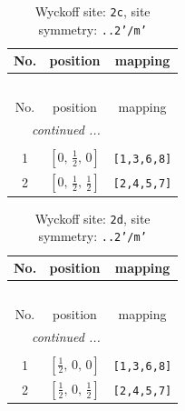 \documentclass[fleqn,8pt]{jsarticle}
\begin{document}
\renewcommand{\arraystretch}{1.2}
\begin{longtable}{ccc}
\caption{Wyckoff site: {\tt 2c}, site symmetry: {\tt ..2'/m'}}
 \\
 \hline \hline
No. & position & mapping \\ \hline \endfirsthead

\multicolumn{2}{l}{\tablename\ \thetable{}} \\
 \hline \hline
No. & position & mapping \\ \hline \endhead

 \hline \hline
\multicolumn{2}{r}{\footnotesize\it continued ...} \\ \endfoot

 \hline \hline
\multicolumn{2}{r}{} \\ \endlastfoot

1 & $\left[ 0,\, \frac{1}{2},\, 0 \right]$ & {\tt [1,3,6,8]} \\ \hline
2 & $\left[ 0,\, \frac{1}{2},\, \frac{1}{2} \right]$ & {\tt [2,4,5,7]} \\
\end{longtable}
\renewcommand{\arraystretch}{1.2}
\begin{longtable}{ccc}
\caption{Wyckoff site: {\tt 2d}, site symmetry: {\tt ..2'/m'}}
 \\
 \hline \hline
No. & position & mapping \\ \hline \endfirsthead

\multicolumn{2}{l}{\tablename\ \thetable{}} \\
 \hline \hline
No. & position & mapping \\ \hline \endhead

 \hline \hline
\multicolumn{2}{r}{\footnotesize\it continued ...} \\ \endfoot

 \hline \hline
\multicolumn{2}{r}{} \\ \endlastfoot

1 & $\left[ \frac{1}{2},\, 0,\, 0 \right]$ & {\tt [1,3,6,8]} \\ \hline
2 & $\left[ \frac{1}{2},\, 0,\, \frac{1}{2} \right]$ & {\tt [2,4,5,7]} \\
\end{longtable}
\renewcommand{\arraystretch}{1.2}
\end{document}
